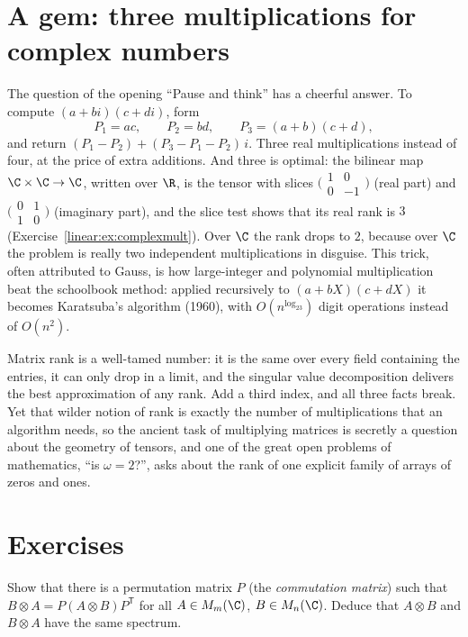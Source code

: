 \section{A gem: three multiplications for complex numbers}

The question of the opening ``Pause and think'' has a cheerful answer. To compute $(a+bi)(c+di)$, form
\[
P_1=ac,\qquad P_2=bd,\qquad P_3=(a+b)(c+d),
\]
and return $(P_1-P_2)+(P_3-P_1-P_2)\,i$. Three real multiplications instead of four, at the price of extra additions. And three is
optimal: the bilinear map $\C\times\C\to\C$, written over $\R$, is the tensor with slices $\bigl(\begin{smallmatrix}1&0\\0&-1\end{smallmatrix}
\bigr)$ (real part) and $\bigl(\begin{smallmatrix}0&1\\1&0\end{smallmatrix}\bigr)$ (imaginary part), and the slice test shows that its
real rank is $3$ (Exercise~\ref{linear:ex:complexmult}). Over $\C$ the rank drops to $2$, because over $\C$ the problem is really two
independent multiplications in disguise. This trick, often attributed to Gauss, is how large-integer and polynomial
multiplication beat the schoolbook method: applied recursively to $(a+bX)(c+dX)$ it becomes Karatsuba's algorithm (1960), with
$O(n^{\log_23})$ digit operations instead of $O(n^2)$.

\begin{beauty}
Matrix rank is a well-tamed number: it is the same over every field containing the entries, it can only drop in a limit, and the
singular value decomposition delivers the best approximation of any rank. Add a third index, and all three facts break. Yet
that wilder notion of rank is exactly the number of multiplications that an algorithm needs, so the ancient task of multiplying
matrices is secretly a question about the geometry of tensors, and one of the great open problems of mathematics, ``is $\omega=2$?'',
asks about the rank of one explicit family of arrays of zeros and ones.
\end{beauty}

\section{Exercises}

\begin{exercise}[$\star$]\label{linear:ex:kroncommute}
Show that there is a permutation matrix $P$ (the \emph{commutation matrix}) such that $B\otimes A=P(A\otimes B)P^{\mathsf T}$ for all
$A\in M_m(\C)$, $B\in M_n(\C)$. Deduce that $A\otimes B$ and $B\otimes A$ have the same spectrum.
\end{exercise}


